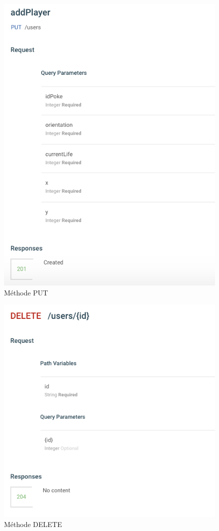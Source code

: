 \documentclass[a4paper,12pt]{article}
\begin{document}
    \begin{figure}[p]
    \includegraphics{PUT.png}
    \caption{\label{uml:module}Méthode PUT}
    \end{figure}
    
    \begin{figure}[p]
    \includegraphics{DELETE.png}
    \caption{\label{uml:module}Méthode DELETE}
    \end{figure}
    
\end{document}
